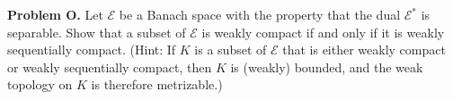 \textbf{Problem O.} Let $\mathcal{E}$ be a Banach space with the property that the dual $\mathcal{E}^*$ is separable. Show that a subset of $\mathcal{E}$ is weakly compact if and only if it is weakly sequentially compact. (Hint: If $K$ is a subset of $\mathcal{E}$ that is either weakly compact or weakly sequentially compact, then $K$ is (weakly) bounded, and the weak topology on $K$ is therefore metrizable.)
